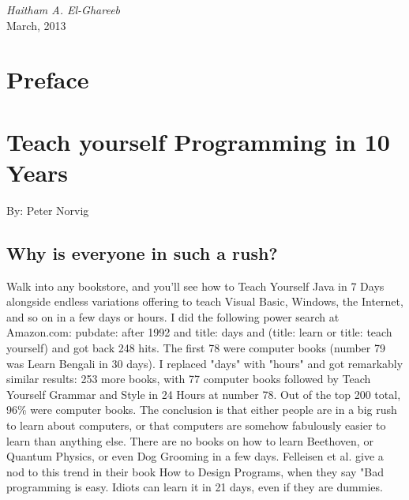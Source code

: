 \documentclass[12pt,a4paper,final,twoside,onecolumn,titlepage]{book}
\begin{document}
\thispagestyle{empty}

\begin{flushright}
\textit{Haitham A. El-Ghareeb} \\
March, 2013
\end{flushright}

\cleardoublepage
{}
\tableofcontents

\chapter{Preface}

\mainmatter

\chapter{Teach yourself Programming in 10 Years}

By: Peter Norvig

\section{Why is everyone in such a rush?}

Walk into any bookstore, and you'll see how to Teach Yourself Java in 7 Days alongside endless variations offering to teach Visual Basic, Windows, the Internet, and so on in a few days or hours. I did the following power search at Amazon.com: pubdate: after 1992 and title: days and (title: learn or title: teach yourself)
and got back 248 hits. The first 78 were computer books (number 79 was Learn Bengali in 30 days). I replaced "days" with "hours" and got remarkably similar results: 253 more books, with 77 computer books followed by Teach Yourself Grammar and Style in 24 Hours at number 78. Out of the top 200 total, 96\% were computer books.
The conclusion is that either people are in a big rush to learn about computers, or that computers are somehow fabulously easier to learn than anything else. There are no books on how to learn Beethoven, or Quantum Physics, or even Dog Grooming in a few days. Felleisen et al. give a nod to this trend in their book How to Design Programs, when they say "Bad programming is easy. Idiots can learn it in 21 days, even if they are dummies.
\end{document}
